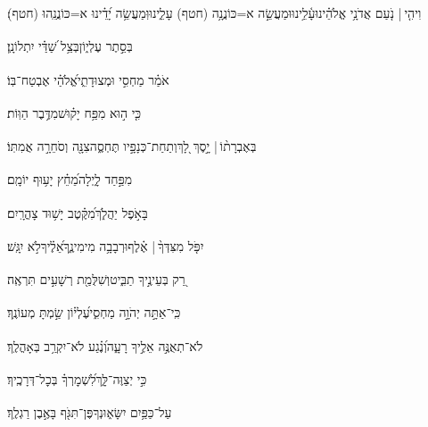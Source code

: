 \documentclass[12pt]{article}
\newcommand{\loc}[1]{\textsuperscript{\locf{#1}}}
\begin{document}
{\loc{ יז}~}‏וִיהִ֤י |  נֹ֤עַם אֲדֹנָ֥י אֱלֹהֵ֗ינוּ{\hfill}עָ֫לֵ֥ינוּ\newline\hspace*{.5em}וּמַעֲשֵׂ֣ה  א=כּוֹנֲנָ֥ה (חטף) עָלֵ֑ינוּ{\hfill}וּֽמַעֲשֵׂ֥ה יָ֝דֵ֗ינוּ א=כּוֹנֲנֵֽהוּ (חטף)׃\par\pend
\ledpb
\pstart[\subsection*{\textcolor{red}{פרק צא}}]\label{פרק צא}
{\loc{ א}~}‏ בְּסֵ֣תֶר עֶלְי֑וֹן{\hfill}בְּצֵ֥ל שַׁ֝דַּ֗י יִתְלוֹנָֽן׃\par

{\loc{ ב}~}‏אֹמַ֗ר  מַחְסִ֣י וּמְצוּדָתִ֑י{\hfill}אֱ֝לֹהַ֗י אֶבְטַח־בּֽוֹ׃\par

{\loc{ ג}~}‏כִּ֤י ה֣וּא  מִפַּ֥ח יָק֗וּשׁ{\hfill}מִדֶּ֥בֶר הַוּֽוֹת׃\par

{\loc{ ד}~}‏בְּאֶבְרָת֨וֹ | {\hfill}יָ֣סֶךְ לָ֭ךְ\newline\hspace*{.5em}וְתַחַת־כְּנָפָ֣יו תֶּחְסֶ֑ה{\hfill}צִנָּ֖ה וְסֹחֵרָ֣ה אֲמִתּֽוֹ׃\par

{\loc{ ה}~}‏ מִפַּ֣חַד לָ֑יְלָה{\hfill}מֵ֝חֵ֗ץ יָע֥וּף יוֹמָֽם׃\par

{\loc{ ו}~}‏ בָּאֹ֣פֶל יַהֲלֹ֑ךְ{\hfill}מִ֝קֶּ֗טֶב יָשׁ֥וּד צָהֳרָֽיִם׃\par

{\loc{ ז}~}‏יִפֹּ֤ל מִצִּדְּךָ֨ |  אֶ֗לֶף{\hfill}וּרְבָבָ֥ה מִימִינֶ֑ךָ\newline\hspace*{.5em}אֵ֝לֶ֗יךָ{\hfill}לֹ֣א יִגָּֽשׁ׃\par

{\loc{ ח}~}‏רַ֭ק בְּעֵינֶ֣יךָ תַבִּ֑יט{\hfill}וְשִׁלֻּמַ֖ת רְשָׁעִ֣ים תִּרְאֶֽה׃\par

{\loc{ ט}~}‏כִּֽי־אַתָּ֣ה יְהֹוָ֣ה מַחְסִ֑י{\hfill}עֶ֝לְי֗וֹן שַׂ֣מְתָּ מְעוֹנֶֽךָ׃\par

{\loc{ י}~}‏לֹא־תְאֻנֶּ֣ה אֵלֶ֣יךָ רָעָ֑ה{\hfill}וְ֝נֶ֗גַע לֹא־יִקְרַ֥ב בְּאָהֳלֶֽךָ׃\par

{\loc{ יא}~}‏כִּ֣י  יְצַוֶּה־לָּ֑ךְ{\hfill}לִ֝שְׁמׇרְךָ֗ בְּכׇל־דְּרָכֶֽיךָ׃\par

{\loc{ יב}~}‏עַל־כַּפַּ֥יִם יִשָּׂא֑וּנְךָ{\hfill}פֶּן־תִּגֹּ֖ף בָּאֶ֣בֶן רַגְלֶֽךָ׃\par
\end{document}
